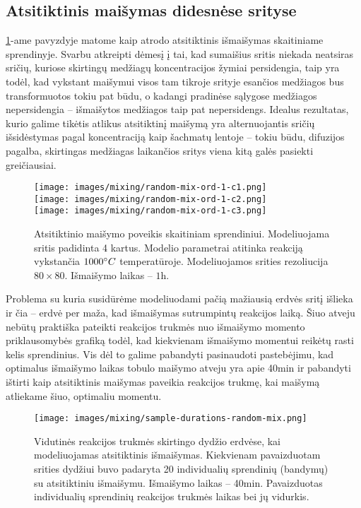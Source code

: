 \subsection{Atsitiktinis maišymas didesnėse srityse}
\ref{fig:random-mix-larger-example}-ame pavyzdyje matome kaip atrodo atsitiktinis išmaišymas skaitiniame sprendinyje. Svarbu atkreipti dėmesį į tai, kad sumaišius sritis niekada neatsiras sričių, kuriose skirtingų medžiagų koncentracijos žymiai persidengia, taip yra todėl, kad vykstant maišymui visos tam tikroje srityje esančios medžiagos bus transformuotos tokiu pat būdu, o kadangi pradinėse sąlygose medžiagos nepersidengia -- išmaišytos medžiagos taip pat nepersidengs. Idealus rezultatas, kurio galime tikėtis atlikus atsitiktinį maišymą yra alternuojantis sričių išsidėstymas pagal koncentraciją kaip šachmatų lentoje -- tokiu būdu, difuzijos pagalba, skirtingas medžiagas laikančios sritys viena kitą galės pasiekti greičiausiai.

\newpage

\begin{figure}[h!]
  \centering
  \texttt{[image: images/mixing/random-mix-ord-1-c1.png]} \\ 
  \texttt{[image: images/mixing/random-mix-ord-1-c2.png]} \\
  \texttt{[image: images/mixing/random-mix-ord-1-c3.png]}
  \caption{Atsitiktinio maišymo poveikis skaitiniam sprendiniui. Modeliuojama sritis padidinta 4 kartus. Modelio parametrai atitinka reakciją vykstančia $1000\degree C$ temperatūroje. Modeliuojamos srities rezoliucija $80\times80$. Išmaišymo laikas -- $1\text{h}. $}
  \label{fig:random-mix-larger-example}
\end{figure}

Problema su kuria susidūrėme modeliuodami pačią mažiausią erdvės sritį išlieka ir čia -- erdvė per maža, kad išmaišymas sutrumpintų reakcijos laiką. Šiuo atveju nebūtų praktiška pateikti reakcijos trukmės nuo išmaišymo momento priklausomybės grafiką todėl, kad kiekvienam išmaišymo momentui reikėtų rasti kelis sprendinius. Vis dėl to galime pabandyti pasinaudoti pastebėjimu, kad optimalus išmaišymo laikas tobulo maišymo atveju yra apie 40min ir pabandyti ištirti kaip atsitiktinis maišymas paveikia reakcijos trukmę, kai maišymą atliekame šiuo, optimaliu momentu. 

\begin{figure}[h!]
  \centering
  \texttt{[image: images/mixing/sample-durations-random-mix.png]}
  \caption{Vidutinės reakcijos trukmės skirtingo dydžio erdvėse, kai modeliuojamas atsitiktinis išmaišymas. Kiekvienam pavaizduotam srities dydžiui buvo padaryta 20 individualių sprendinių (bandymų) su atsitiktiniu išmaišymu. Išmaišymo laikas -- 40min. Pavaizduotas individualių sprendinių reakcijos trukmės laikas bei jų vidurkis.}
  \label{fig:random-samples}
\end{figure}

